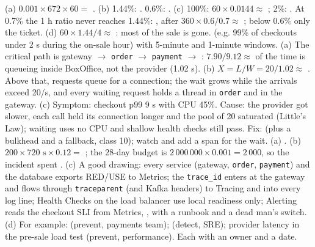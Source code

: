  (a) $0.001 \times 672 \times 60 =$ . (b) 1.44\%: . 0.6\%: . (c) 100\%: $60 \times 0.0144 \approx$ ; 2\%: . At 0.7\% the 1 h ratio never reaches 1.44\%: , after $360 \times 0.6/0.7 \approx$ ; below 0.6\% only the ticket. (d) $60 \times 1.44/4 \approx$ : most of the sale is gone.  (e.g. 99\% of checkouts under 2 s during the on-sale hour) with 5-minute and 1-minute windows.
 (a) The critical path is gateway $\to$ \texttt{order} $\to$ \texttt{payment} $\to$ : $7.90/9.12 \approx$  of the time is queueing inside BoxOffice, not the provider (1.02 s). (b) $X = L/W = 20/1.02 \approx$ . Above that, requests queue for a connection; the wait grows while the arrivals exceed 20/s, and every waiting request holds a thread in \texttt{order} and in the gateway. (c) Symptom: checkout p99 9 s with CPU 45\%. Cause: the provider got slower, each call held its connection longer and the pool of 20 saturated (Little's Law); waiting uses no CPU and shallow health checks still pass. Fix:  (plus a bulkhead and a fallback, class 10); watch  and add a span for the wait.
 (a) . (b) $200 \times 720 \text{ s} \times 0.12 =$ ; the 28-day budget is $2\,000\,000 \times 0.001 = 2\,000$, so the incident spent . (c) A good drawing: every service (gateway, \texttt{order}, \texttt{payment}) and the database exports RED/USE to Metrics; the \texttt{trace\_id} enters at the gateway and flows through \texttt{traceparent} (and Kafka headers) to Tracing and into every log line; Health Checks on the load balancer use local readiness only; Alerting reads the checkout SLI from Metrics, , with a runbook and a dead man's switch. (d) For example:  (prevent, payments team);  (detect, SRE); provider latency in the pre-sale load test (prevent, performance). Each with an owner and a date.
